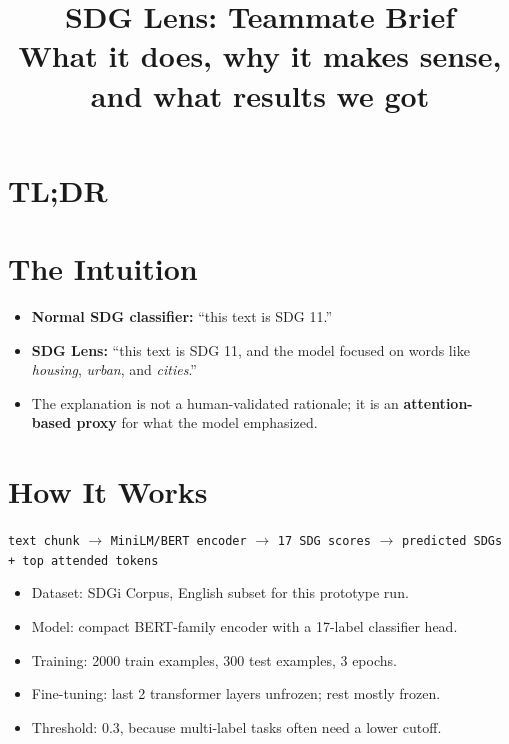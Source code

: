 \documentclass[10pt]{article}
\title{\vspace{-2.2em}\textbf{SDG Lens: Teammate Brief}\\
\large What it does, why it makes sense, and what results we got}
\author{}
\date{}
\begin{document}
\maketitle
\vspace{-3.4em}

\section*{TL;DR}

\section*{The Intuition}
\begin{itemize}
    \item \textbf{Normal SDG classifier:} ``this text is SDG 11.''
    \item \textbf{SDG Lens:} ``this text is SDG 11, and the model focused on
    words like \emph{housing}, \emph{urban}, and \emph{cities}.''
    \item The explanation is not a human-validated rationale; it is an
    \textbf{attention-based proxy} for what the model emphasized.
\end{itemize}

\section*{How It Works}
\begin{center}
\small
\texttt{text chunk} $\rightarrow$
\texttt{MiniLM/BERT encoder} $\rightarrow$
\texttt{17 SDG scores} $\rightarrow$
\texttt{predicted SDGs + top attended tokens}
\end{center}

\begin{itemize}
    \item Dataset: SDGi Corpus, English subset for this prototype run.
    \item Model: compact BERT-family encoder with a 17-label classifier head.
    \item Training: 2000 train examples, 300 test examples, 3 epochs.
    \item Fine-tuning: last 2 transformer layers unfrozen; rest mostly frozen.
    \item Threshold: 0.3, because multi-label tasks often need a lower cutoff.
\end{itemize}
\end{document}
